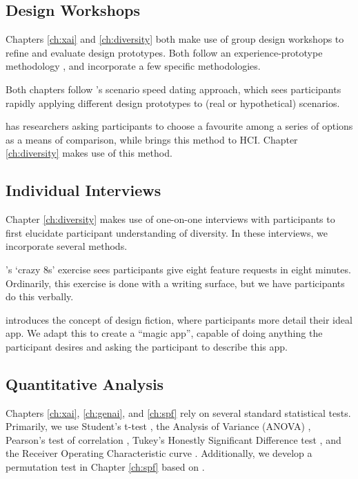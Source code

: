 \subsection{Design Workshops}
Chapters \ref{ch:xai} and \ref{ch:diversity} both make use of group design workshops to refine and evaluate design prototypes. Both follow an experience-prototype methodology \cite{Buchenau_Suri_2000}, and incorporate a few specific methodologies.

Both chapters follow \textcite{Zimmerman_Forlizzi_2017}'s scenario speed dating approach, which sees participants rapidly applying different design prototypes to (real or hypothetical) scenarios.

\textcite{Gatian_1994} has researchers asking participants to choose a favourite among a series of options as a means of comparison, while \textcite{Griffiths_Johnson_Hartley_2007} brings this method to HCI. Chapter \ref{ch:diversity} makes use of this method.

\subsection{Individual Interviews}
Chapter \ref{ch:diversity} makes use of one-on-one interviews with participants to first elucidate participant understanding of diversity. In these interviews, we incorporate several methods.

\textcite{Knapp_Zeratzky_Kowitz_2016}'s `crazy 8s' exercise sees participants give eight feature requests in eight minutes. Ordinarily, this exercise is done with a writing surface, but we have participants do this verbally.

\textcite{blythe2014research} introduces the concept of design fiction, where participants more detail their ideal app. We adapt this to create a ``magic app'', capable of doing anything the participant desires and asking the participant to describe this app.

\subsection{Quantitative Analysis}
Chapters \ref{ch:xai}, \ref{ch:genai}, and \ref{ch:spf} rely on several standard statistical tests. Primarily, we use Student's t-test \cite{Mishra_Singh_Pandey_Mishra_Pandey_2019}, the Analysis of Variance (ANOVA) \cite{Mishra_Singh_Pandey_Mishra_Pandey_2019}, Pearson's test of correlation \cite{Schober_Boer_Schwarte_2018}, Tukey's Honestly Significant Difference test \cite{Kim_2015}, and the Receiver Operating Characteristic curve \cite{hanley1989receiver}. Additionally, we develop a permutation test in Chapter \ref{ch:spf} based on \textcite{good2013permutation}.

